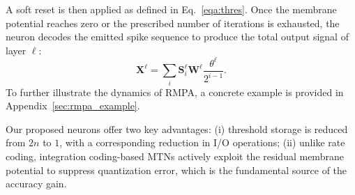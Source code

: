 A soft reset is then applied as defined in Eq.~\eqref{eqa:thres}. Once the membrane potential reaches zero or the prescribed number of iterations is exhausted, the neuron decodes the emitted spike sequence to produce the total output signal of layer $\ell$:
\begin{equation}
{\mathbf{X}}^{\ell} = \sum_{i}\mathbf{S}_i^\ell \mathbf{W}^\ell \frac{ \theta^\ell}{2^{i-1}}.
\end{equation}
To further illustrate the dynamics of RMPA, a concrete example is provided in Appendix~\ref{sec:rmpa_example}.




Our proposed neurons offer two key advantages: (i) threshold storage is reduced from $2n$ to $1$, with a corresponding reduction in I/O operations; (ii) unlike rate coding, integration coding-based MTNs actively exploit the residual membrane potential to suppress quantization error, which is the fundamental source of the accuracy gain.


